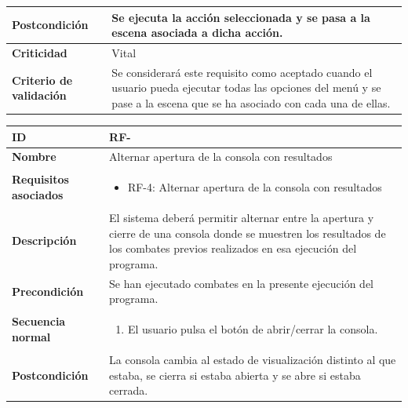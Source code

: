 \begin{center}
\begin{tabular}{ | p{4.7cm} | p{10cm} | }
		\hline
		\textbf{Postcondición} & 
		Se ejecuta la acción seleccionada y se pasa a la escena asociada a dicha acción.\\
		
		\hline 
		\textbf{Criticidad} &
		Vital\\
		
		\hline 
		\textbf{Criterio de validación} & 
		Se considerará este requisito como aceptado cuando el usuario pueda ejecutar todas las opciones del menú y se pase a la escena que se ha asociado con cada una de ellas.\\
		
		\hline
	\end{tabular}
\end{center}

\begin{center}
	\begin{tabular}{ | p{4.7cm} | p{10cm} | } 
		\hline
		
		\textbf{ID} & RF-\arabic{contador_requisitos_funcionales}
		{contador_requisitos_funcionales} \\
		
		\hline 
		\textbf{Nombre} &
		Alternar apertura de la consola con resultados\\ 
		
		\hline
		\textbf{Requisitos asociados} & 
		\begin{itemize}
			\item RF-4: Alternar apertura de la consola con resultados
		\end{itemize}\\
		
		\hline
		\textbf{Descripción} & 
		El sistema deberá permitir alternar entre la apertura y cierre de una consola donde se muestren los resultados de los combates previos realizados en esa ejecución del programa.\\
		
		\hline
		\textbf{Precondición} & 
		Se han ejecutado combates en la presente ejecución del programa.\\
		
		\hline
		\textbf{Secuencia normal} &
		\begin{enumerate}
			\item El usuario pulsa el botón de abrir/cerrar la consola.
		\end{enumerate}
		\\
		
		\hline
		\textbf{Postcondición} & 
		La consola cambia al estado de visualización distinto al que estaba, se cierra si estaba abierta y se abre si estaba cerrada.\\
		

\end{tabular}
\end{center}
